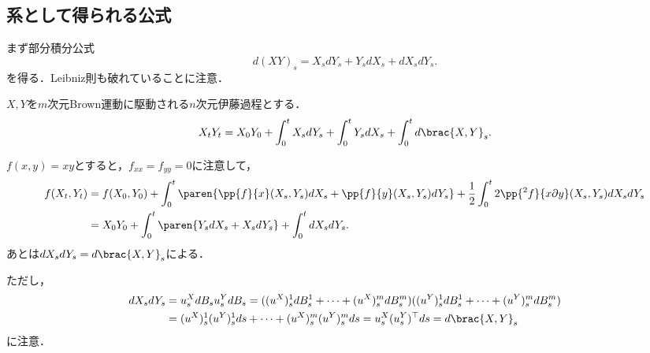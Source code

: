 \documentclass[uplatex,dvipdfmx]{jsreport}
\begin{document}
\subsection{系として得られる公式}

\begin{tcolorbox}[colframe=ForestGreen, colback=ForestGreen!10!white,breakable,colbacktitle=ForestGreen!40!white,coltitle=black,fonttitle=\bfseries\sffamily,
title=]
    まず部分積分公式
    \[d(XY)_s=X_sdY_s+Y_sdX_s+dX_sdY_s.\]
    を得る．Leibniz則も破れていることに注意．
\end{tcolorbox}

\begin{corollary}[部分積分公式]\label{cor-integration-by-parts}
    $X,Y$を$m$次元Brown運動に駆動される$n$次元伊藤過程とする．
    \[X_tY_t=X_0Y_0+\int^t_0X_sdY_s+\int^t_0Y_sdX_s+\int^t_0d\brac{X,Y}_s.\]
\end{corollary}
\begin{Proof}
    $f(x,y)=xy$とすると，$f_{xx}=f_{yy}=0$に注意して，
    \begin{align*}
        f(X_t,Y_t)&=f(X_0,Y_0)+\int^t_0\paren{\pp{f}{x}(X_s,Y_s)dX_s+\pp{f}{y}(X_s,Y_s)dY_s}+\frac{1}{2}\int^t_02\pp{^2f}{x\partial y}(X_s,Y_s)dX_sdY_s\\
        &=X_0Y_0+\int^t_0\paren{Y_sdX_s+X_sdY_s}+\int^t_0dX_sdY_s.
    \end{align*}
    あとは$dX_sdY_s=d\brac{X,Y}_s$による．
\end{Proof}
\begin{remark}
    ただし，
    \begin{align*}
        dX_sdY_s&=u^X_sdB_su^Y_sdB_s=((u^X)^1_sdB_s^1+\cdots+(u^X)^m_sdB_s^m)((u^Y)^1_sdB_s^1+\cdots+(u^Y)^m_sdB_s^m)\\
        &=(u^X)^1_s(u^Y)^1_sds+\cdots+(u^X)^m_s(u^Y)^m_sds=u^X_s(u^Y_s)^\top ds=d\brac{X,Y}_s
    \end{align*}
    に注意．
\end{remark}
\end{document}
